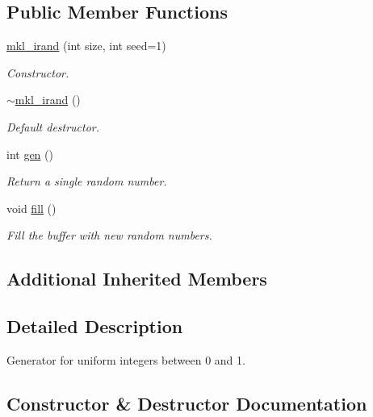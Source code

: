 \subsection*{Public Member Functions}
\begin{DoxyCompactItemize}
\item 
\hyperlink{classmklrand_1_1mkl__irand_a1f5cc9cb9269f9a24ee038aad3b64493}{mkl\+\_\+irand} (int size, int seed=1)
\begin{DoxyCompactList}\small\item\em Constructor. \end{DoxyCompactList}\item 
\hyperlink{classmklrand_1_1mkl__irand_a2febc3efc937b26f8cdb393a5f7735e5}{$\sim$mkl\+\_\+irand} ()
\begin{DoxyCompactList}\small\item\em Default destructor. \end{DoxyCompactList}\item 
int \hyperlink{classmklrand_1_1mkl__irand_a9e5b0289f101dc0ccd1aeff741714e5a}{gen} ()
\begin{DoxyCompactList}\small\item\em Return a single random number. \end{DoxyCompactList}\item 
void \hyperlink{classmklrand_1_1mkl__irand_ae1469013948288cef622ab879f56ff64}{fill} ()
\begin{DoxyCompactList}\small\item\em Fill the buffer with new random numbers. \end{DoxyCompactList}\end{DoxyCompactItemize}
\subsection*{Additional Inherited Members}


\subsection{Detailed Description}
Generator for uniform integers between 0 and 1. 

\subsection{Constructor \& Destructor Documentation}
